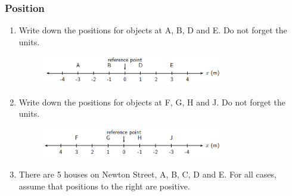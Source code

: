             \subsubsection{  Position }
            \nopagebreak
        \label{m38787*id62859}\begin{enumerate}[noitemsep, label=\textbf{\arabic*}. ] 
            \label{m38787*uid11}\item Write down the positions for objects at A, B, D and E. Do not forget the units.
    \setcounter{subfigure}{0}
	\begin{figure}[H] %
    \begin{center}
    \label{m38787*id62877!!!underscore!!!media}\label{m38787*id62877!!!underscore!!!printimage}\includegraphics[width=300px]{col11305.imgs/m38787_PG10C2_005.png} %
      \vspace{2pt}
    \vspace{.1in}
    \end{center}
 \end{figure}               \label{m38787*uid12}\item Write down the positions for objects at F, G, H and J. Do not forget the units.
    \setcounter{subfigure}{0}
	\begin{figure}[H] %
    \begin{center}
    \label{m38787*id62899!!!underscore!!!media}\label{m38787*id62899!!!underscore!!!printimage}\includegraphics[width=300px]{col11305.imgs/m38787_PG10C2_006.png} %
      \vspace{2pt}
    \vspace{.1in}
    \end{center}
 \end{figure}               \label{m38787*uid13}\item There are 5 houses on Newton Street, A, B, C, D and E. For all cases, assume that positions to the right are positive.
    \setcounter{subfigure}{0}
	\begin{figure}[H] %
    \begin{center}

\end{center}
\end{figure}
\end{enumerate}
